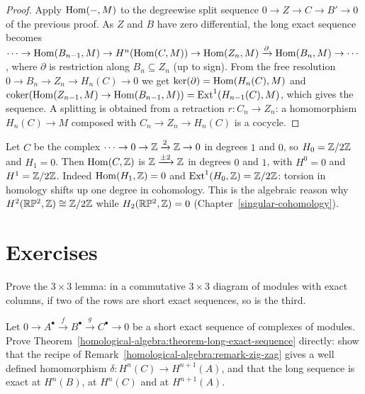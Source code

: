 \begin{proof}
Apply $\operatorname{Hom}(-, M)$ to the degreewise split sequence $0 \to Z \to C \to B' \to 0$ of the previous proof. As $Z$ and $B$ have zero
differential, the long exact sequence becomes
$\cdots \to \operatorname{Hom}(B_{n-1}, M) \to H^n(\operatorname{Hom}(C, M)) \to \operatorname{Hom}(Z_n, M) \xrightarrow{\partial} \operatorname{Hom}(B_n, M) \to \cdots$, where $\partial$ is restriction
along $B_n \subseteq Z_n$ (up to sign). From the free resolution $0 \to B_n \to Z_n \to H_n(C) \to 0$ we get
$\ker(\partial) = \operatorname{Hom}(H_n(C), M)$ and $\operatorname{coker}(\operatorname{Hom}(Z_{n-1}, M) \to \operatorname{Hom}(B_{n-1}, M)) = \operatorname{Ext}^1(H_{n-1}(C), M)$, which gives the
sequence. A splitting is obtained from a retraction $r \colon C_n \to Z_n$: a homomorphism $H_n(C) \to M$ composed with
$C_n \to Z_n \to H_n(C)$ is a cocycle.
\end{proof}

\begin{example}\label{homological-algebra:example-uct}
Let $C$ be the complex $\cdots \to 0 \to \mathbb{Z} \xrightarrow{2} \mathbb{Z} \to 0$ in degrees $1$ and $0$, so $H_0 = \mathbb{Z}/2\mathbb{Z}$ and $H_1 = 0$. Then
$\operatorname{Hom}(C, \mathbb{Z})$ is $\mathbb{Z} \xrightarrow{\pm 2} \mathbb{Z}$ in degrees $0$ and $1$, with $H^0 = 0$ and $H^1 = \mathbb{Z}/2\mathbb{Z}$. Indeed
$\operatorname{Hom}(H_1, \mathbb{Z}) = 0$ and $\operatorname{Ext}^1(H_0, \mathbb{Z}) = \mathbb{Z}/2\mathbb{Z}$: torsion in homology shifts up one degree in cohomology. This is the
algebraic reason why $H^2(\mathbb{R}\mathbb{P}^2, \mathbb{Z}) \cong \mathbb{Z}/2\mathbb{Z}$ while $H_2(\mathbb{R}\mathbb{P}^2, \mathbb{Z}) = 0$ (Chapter~\ref{singular-cohomology}).
\end{example}

\section{Exercises}\label{homological-algebra:section-exercises}

\begin{exercise}\label{homological-algebra:exercise-nine-lemma}
Prove the $3 \times 3$ lemma: in a commutative $3 \times 3$ diagram of modules with exact columns, if two of the rows are short exact
sequences, so is the third.
\end{exercise}

\begin{exercise}\label{homological-algebra:exercise-zig-zag}
Let $0 \to A^\bullet \xrightarrow{f} B^\bullet \xrightarrow{g} C^\bullet \to 0$ be a short exact sequence of complexes of modules.
Prove Theorem~\ref{homological-algebra:theorem-long-exact-sequence} directly: show that the recipe of
Remark~\ref{homological-algebra:remark-zig-zag} gives a well defined homomorphism $\delta \colon H^n(C) \to H^{n+1}(A)$, and that
the long sequence is exact at $H^n(B)$, at $H^n(C)$ and at $H^{n+1}(A)$.
\end{exercise}

